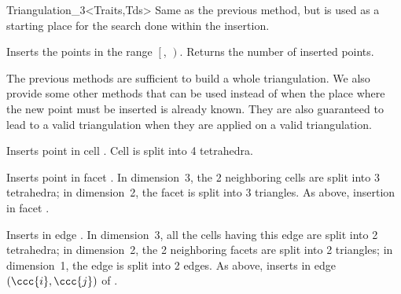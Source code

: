 \begin{ccClassTemplate}{Triangulation_3<Traits,Tds>}
{Same as the previous method, but  is used as a starting
place for the search done within the insertion.}

{Inserts the points in the range $\left[\right.$,
$\left.\right)$.  Returns the number of inserted points.
}

The previous methods are sufficient to build a whole triangulation. We
also provide some other methods that can be used instead of
 when the place where the new point  must be inserted
is already known. They are also guaranteed to lead to a valid
triangulation when they are applied on a valid triangulation.

{Inserts point  in cell . Cell  is split into 4
tetrahedra.
} 

{Inserts point  in facet . In dimension~3, the 2
neighboring cells are split into 3 tetrahedra; in dimension~2, the facet 
is split into 3 triangles.
}
\ccGlue
{}
{As above, insertion in facet .
}

{Inserts  in edge . In dimension~3, 
all the cells having this edge are split into 2 tetrahedra; in
dimension~2, the 2 neighboring facets are split into 2 triangles; in
dimension~1, the edge is split into 2 edges.
}
\ccGlue
{} 
{As above, inserts  in edge $(\ccc{i}, \ccc{j})$ of .
} 


\end{ccClassTemplate}
